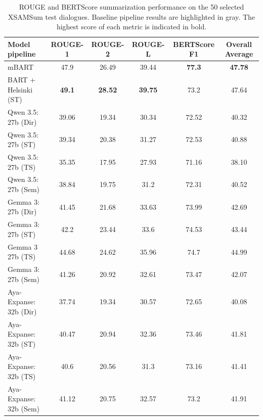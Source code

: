 \documentclass[11pt]{article}
\begin{document}
\begin{table}[ht]
\centering
\small
\begin{tabular}{lccccc}
\hline
\textbf{Model pipeline} & \textbf{ROUGE-1} & \textbf{ROUGE-2} & \textbf{ROUGE-L} & \textbf{BERTScore F1} & \textbf{Overall Average} \\ \hline
\rowcolor{gray!15}mBART & 47.9 & 26.49 & 39.44 & \textbf{77.3} & \textbf{47.78}\\
\rowcolor{gray!15}BART + Helsinki (ST) & \textbf{49.1} & \textbf{28.52} & \textbf{39.75} & 73.2 & 47.64 \\
\hline
Qwen 3.5: 27b (Dir)    & 39.06 & 19.34 & 30.34 & 72.52 & 40.32 \\
Qwen 3.5: 27b (ST)     & 39.34 & 20.38 & 31.27 & 72.53 & 40.88 \\
Qwen 3.5: 27b (TS)     & 35.35 & 17.95 & 27.93 & 71.16 & 38.10 \\
Qwen 3.5: 27b (Sem)    & 38.84 & 19.75 & 31.2  & 72.31 & 40.52 \\
\hline
Gemma 3: 27b (Dir)     & 41.45 & 21.68 & 33.63 & 73.99 & 42.69 \\
Gemma 3: 27b (ST)      & 42.2  & 23.44 & 33.6  & 74.53 & 43.44 \\
Gemma 3 27b (TS)       & 44.68 & 24.62 & 35.96 & 74.7  & 44.99 \\
Gemma 3: 27b (Sem)     & 41.26 & 20.92 & 32.61 & 73.47 & 42.07 \\
\hline
Aya-Expanse: 32b (Dir) & 37.74 & 19.34 & 30.57 & 72.65 & 40.08 \\
Aya-Expanse: 32b (ST)  & 40.47 & 20.94 & 32.36 & 73.46 & 41.81 \\
Aya-Expanse: 32b (TS)  & 40.6  & 20.56 & 31.3  & 73.16 & 41.41 \\
Aya-Expanse: 32b (Sem) & 41.12 & 20.75 & 32.57 & 73.2 & 41.91 \\
\hline
\end{tabular}
\caption{ROUGE and BERTScore summarization performance on the 50 selected XSAMSum test dialogues. Baseline pipeline results are highlighted in gray. The highest score of each metric is indicated in bold.}
\label{tab:rouge_bertscore_results}
\end{table}
\end{document}

